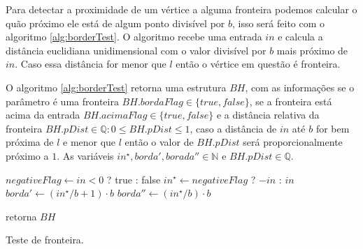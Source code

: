 Para detectar a proximidade de um vértice a alguma fronteira podemos calcular o 
quão próximo ele está de algum ponto divisível por $b$, isso será feito com 
o algoritmo \ref{alg:borderTest}. O algoritmo recebe uma entrada $in$ e calcula
a distância euclidiana unidimensional com o valor divisível por $b$ mais próximo 
de $in$. Caso essa distância for menor que $l$ então o vértice em questão é 
fronteira.

O algoritmo \ref{alg:borderTest} retorna uma estrutura $BH$, com as informações
se o parâmetro é uma fronteira $BH.bordaFlag \in \{true, false\}$, se a fronteira 
está acima da entrada $BH.acimaFlag \in \{true, false\}$ e a distância relativa 
da fronteira $BH.pDist \in \mathbb{Q}: 0 \leq BH.pDist \leq 1$, caso a distância de $in$ até $b$ for bem 
próxima de $l$ e menor que $l$ então o valor de $BH.pDist$ será proporcionalmente
próximo a $1$. As variáveis
$in^{\star}, borda', borada'' \in \mathbb{N}$ e $BH.pDist \in \mathbb{Q}$.

\begin{algorithm}[H]\label{alg:borderTest}%
    $negativeFlag \leftarrow in < 0$ ? true : false\;
    $in^{\star} \leftarrow negativeFlag$ ? $-in$ : $in$\;
    $borda' \leftarrow (in^{\star}/b +1) \cdot b$\;
    $borda'' \leftarrow (in^{\star}/b) \cdot b$\;
    
    retorna $BH$\;
    \caption{Teste de fronteira.}
\end{algorithm}

